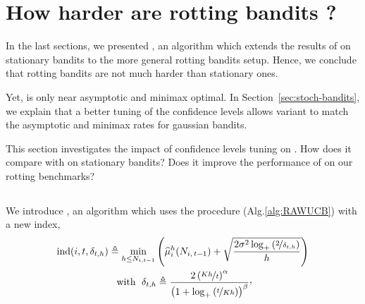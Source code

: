 \section{How harder are rotting bandits ?}
\label{sec:howhard}
In the last sections, we presented \RAWUCB, an algorithm which extends the results of \UCBone \citep{auer2002finite} on stationary bandits to the more general rotting bandits setup. Hence, we conclude that rotting bandits are not much harder than stationary ones. 

Yet, \UCBone is only near asymptotic and minimax optimal. In Section~\ref{sec:stoch-bandits}, we explain that a better tuning of the confidence levels allows \UCB variant to match the asymptotic and minimax rates for gaussian bandits.

This section investigates the impact of confidence levels tuning on \RAWUCB. How does it compare with \UCB on stationary bandits?  Does it improve the performance of \RAWUCB on our rotting benchmarks? 

\subsection{{\RAWUCBpp}}
We introduce \RAWUCBpp, an algorithm which uses the \RAWUCB procedure (Alg.\ref{alg:RAWUCB}) with a new index,
\begin{multline}
\label{eq:rawpp_index}
\operatorname{ind}(i,t, \delta_{t,h}) \triangleq \min_{h\leq N_{i,t-1}}\pa{ {\hmu}_i^h(\Nitmone) + \sqrt{\frac{2\sigma^2\log_+\pa{\nicefrac{2}{\delta_{t,h}}}}{h}}}\\ \text{ with } \; \delta_{t,h} \triangleq \frac{2\pa{\nicefrac{Kh}{t}}^\alpha}{\pa{1+ \log_+\pa{\nicefrac{t}{Kh}}}^\beta}\CommaBin
\end{multline}

